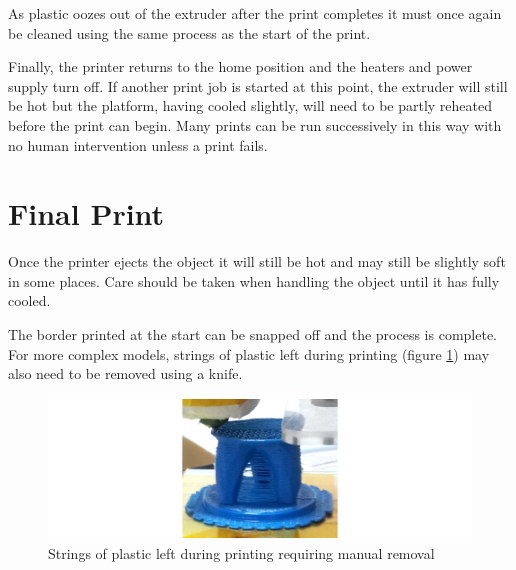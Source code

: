 			As plastic oozes out of the extruder after the print completes it must
			once again be cleaned using the same process as the start of the print.
			
			Finally, the printer returns to the home position and the heaters and
			power supply turn off. If another print job is started at this point, the
			extruder will still be hot but the platform, having cooled slightly, will
			need to be partly reheated before the print can begin. Many prints can be
			run successively in this way with no human intervention unless a print
			fails.
		
	\section{Final Print}
		
		Once the printer ejects the object it will still be hot and may still be
		slightly soft in some places. Care should be taken when handling the object
		until it has fully cooled.
		
		The border printed at the start can be snapped off and the process is
		complete.  For more complex models, strings of plastic left during printing
		(figure \ref{fig:stringing}) may also need to be removed using a knife.
		
		\begin{figure}
			\includegraphics[width=1\textwidth]{diagrams/stringing.pdf}
			\caption{Strings of plastic left during printing requiring manual removal}
			\label{fig:stringing}
		\end{figure}
